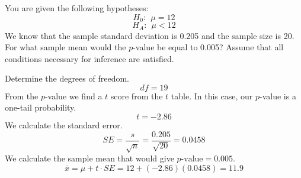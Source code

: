 
\begin{question}
You are given the following hypotheses: \[H_0:~~ \mu = 12\]
\[H_A:~~ \mu < 12\] We know that the sample standard deviation is 0.205
and the sample size is 20. For what sample mean would the \(p\)-value be
equal to 0.005? Assume that all conditions necessary for inference are
satisfied.
\end{question}

\begin{solution}
Determine the degrees of freedom. \[df = 19 \] From the \(p\)-value we
find a \(t\) score from the \(t\) table. In this case, our \(p\)-value
is a one-tail probability. \[t = -2.86 \] We calculate the standard
error. \[SE = \frac{s}{\sqrt{n}} = \frac{0.205}{\sqrt{20}} = 0.0458 \]
We calculate the sample mean that would give \(p\text{-value} = 0.005\).
\[\bar{x} = \mu+t\cdot SE = 12+(-2.86)(0.0458) = 11.9 \]
\end{solution}

